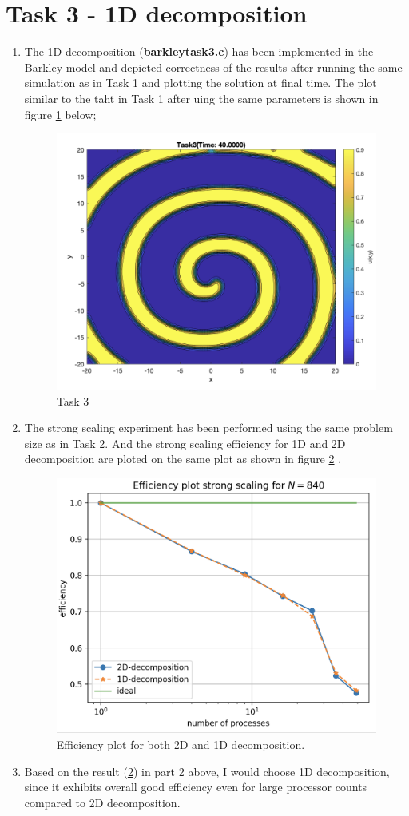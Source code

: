 \documentclass[12pt,a4paper]{article}
\begin{document}
	
	
	\section*{Task 3 - 1D decomposition}	
	
	\begin{enumerate}
		\item The 1D decomposition (\textbf{barkley\textunderscore task3.c}) has been implemented  in the Barkley model and depicted correctness of the results after running the same simulation as in Task 1 and plotting the solution at final time. The plot similar to the taht in Task 1 after uing the same parameters is shown in figure \ref{fig:Task 3} below;
		
		\begin{figure}[H]
			\centering
			\includegraphics[width=0.5\linewidth]{"Screenshot 2021-03-16 at 6.55.52 PM"}
			\caption{Task 3}
			\label{fig:Task 3}
		\end{figure}
		
		\item The strong scaling experiment has been performed using the same problem size as in Task 2. And the strong scaling efficiency for 1D and 2D decomposition are ploted on the same plot as shown in figure \ref{fig:Task3_2} .
		
		\begin{figure}[H]
			\centering
			\includegraphics[width=0.5\linewidth]{"eff_t3"}
			\caption{Efficiency plot for both 2D and 1D decomposition.}
			\label{fig:Task3_2}
		\end{figure}
	
	\item Based on the result (\ref{fig:Task3_2}) in part 2 above,  I would choose 1D decomposition, since it exhibits overall good efficiency even for large processor counts compared to 2D decomposition.
		
	\end{enumerate}
	
\end{document}
